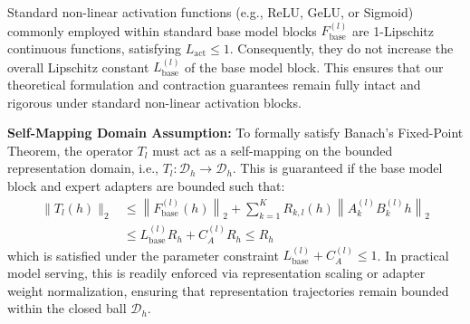 \begin{remark}
Standard non-linear activation functions (e.g., ReLU, GeLU, or Sigmoid) commonly employed within standard base model blocks $F_{\text{base}}^{(l)}$ are 1-Lipschitz continuous functions, satisfying $L_{\text{act}} \le 1$. Consequently, they do not increase the overall Lipschitz constant $L_{\text{base}}^{(l)}$ of the base model block. This ensures that our theoretical formulation and contraction guarantees remain fully intact and rigorous under standard non-linear activation blocks.
\end{remark}

\textbf{Self-Mapping Domain Assumption:}
To formally satisfy Banach's Fixed-Point Theorem, the operator $T_l$ must act as a self-mapping on the bounded representation domain, i.e., $T_l: \mathcal{D}_h \to \mathcal{D}_h$. This is guaranteed if the base model block and expert adapters are bounded such that:
\begin{equation}
\begin{split}
\|T_l(h)\|_2 & \le \left\|F_{\text{base}}^{(l)}(h)\right\|_2 + \sum_{k=1}^K R_{k, l}(h) \left\|A_k^{(l)} B_k^{(l)} h\right\|_2 \\
& \le L_{\text{base}}^{(l)} R_h + C_A^{(l)} R_h \le R_h
\end{split}
\end{equation}
which is satisfied under the parameter constraint $L_{\text{base}}^{(l)} + C_A^{(l)} \le 1$. In practical model serving, this is readily enforced via representation scaling or adapter weight normalization, ensuring that representation trajectories remain bounded within the closed ball $\mathcal{D}_h$.

